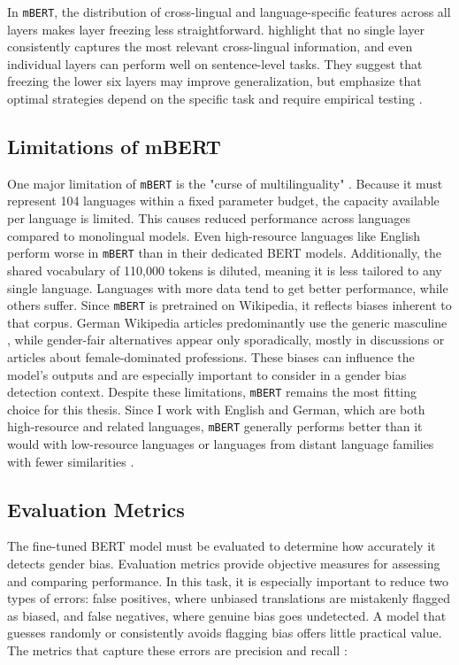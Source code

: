     In \texttt{mBERT}, the distribution of cross-lingual and language-specific features across all layers makes layer freezing less straightforward. \textcite{wuBetoBentzBecas2019} highlight that no single layer consistently captures the most relevant cross-lingual information, and even individual layers can perform well on sentence-level tasks. They suggest that freezing the lower six layers may improve generalization, but emphasize that optimal strategies depend on the specific task and require empirical testing \parencite{wuBetoBentzBecas2019}.

\subsection{Limitations of mBERT}
    One major limitation of \texttt{mBERT} is the "curse of multilinguality" \parencite{gurgurovMultilingualLargeLanguage2024}. Because it must represent 104 languages within a fixed parameter budget, the capacity available per language is limited. This causes reduced performance across languages compared to monolingual models. Even high-resource languages like English perform worse in \texttt{mBERT} than in their dedicated BERT models. Additionally, the shared vocabulary of 110,000 tokens is diluted, meaning it is less tailored to any single language. Languages with more data tend to get better performance, while others suffer. Since \texttt{mBERT} is pretrained on Wikipedia, it reflects biases inherent to that corpus. German Wikipedia articles predominantly use the generic masculine \parencite{sichlerGenderDifferencesGermanlanguage2014}, while gender-fair alternatives appear only sporadically, mostly in discussions or articles about female-dominated professions. These biases can influence the model’s outputs and are especially important to consider in a gender bias detection context. Despite these limitations, \texttt{mBERT} remains the most fitting choice for this thesis. Since I work with English and German, which are both high-resource and related languages, \texttt{mBERT} generally performs better than it would with low-resource languages or languages from distant language families with fewer similarities \parencite{lauscherZeroHeroLimitations2020}.

\subsection{Evaluation Metrics}
    The fine-tuned BERT model must be evaluated to determine how accurately it detects gender bias. Evaluation metrics provide objective measures for assessing and comparing performance. In this task, it is especially important to reduce two types of errors: false positives, where unbiased translations are mistakenly flagged as biased, and false negatives, where genuine bias goes undetected. A model that guesses randomly or consistently avoids flagging bias offers little practical value. The metrics that capture these errors are precision and recall \parencite{rainioEvaluationMetricsStatistical2024}:

